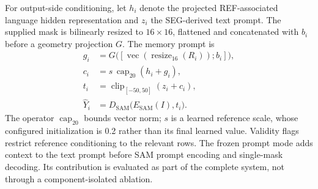 For output-side conditioning, let $h_i$ denote the projected REF-associated
language hidden representation and $z_i$ the SEG-derived text prompt. The
supplied mask is bilinearly resized to $16\times16$, flattened and concatenated
with $b_i$ before a geometry projection $G$. The memory prompt is
\begin{align}
 g_i &= G\bigl([\operatorname{vec}(\operatorname{resize}_{16}(R_i));b_i]\bigr),\\
 c_i &= s\,\operatorname{cap}_{20}(h_i+g_i),\\
 t_i &= \operatorname{clip}_{[-50,50]}(z_i+c_i),\\
 \hat Y_i &= D_{\mathrm{SAM}}\bigl(E_{\mathrm{SAM}}(I),t_i\bigr).
\end{align}
The operator $\operatorname{cap}_{20}$ bounds vector norm; $s$ is a learned
reference scale, whose configured initialization is 0.2 rather than its final
learned value. Validity flags restrict reference conditioning to the relevant
rows. The frozen prompt mode adds context to the text prompt before SAM prompt
encoding and single-mask decoding. Its contribution is evaluated as part of
the complete system, not through a component-isolated ablation.

